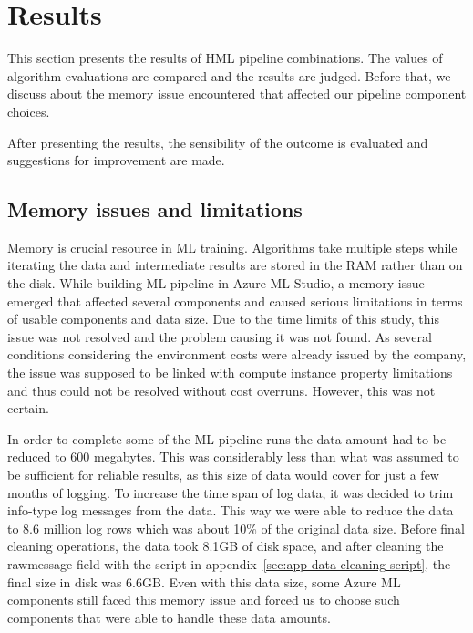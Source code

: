 

\section{Results}\label{sec:results}

This section presents the results of HML pipeline combinations.
The values of algorithm evaluations are compared
and the results are judged.
Before that,
we discuss about the memory issue encountered
that affected our pipeline component choices.

After presenting the results,
the sensibility of the outcome is evaluated
and suggestions for improvement are made.




\subsection{Memory issues and limitations}\label{subsec:res-memory-issues}

Memory is crucial resource in ML training.
Algorithms take multiple steps while iterating the data
and intermediate results are stored in the RAM rather than on the disk.
While building ML pipeline in Azure ML Studio,
a memory issue emerged
that affected several components
and caused serious limitations
in terms of usable components and data size.
Due to the time limits of this study,
this issue was not resolved
and the problem causing it was not found.
As several conditions
considering the environment costs
were already issued by the company,
the issue was supposed to be linked with
compute instance property limitations
and thus could not be resolved without cost overruns.
However, this was not certain.

In order to complete some of the ML pipeline runs
the data amount had to be reduced to 600 megabytes.
This was considerably less than what was assumed to be sufficient
for reliable results,
as this size of data would cover for just a few months of logging.
To increase the time span of log data,
it was decided to trim info-type log messages from the data.
This way we were able to reduce the data to 8.6 million log rows
which was about 10\% of the original data size.
Before final cleaning operations,
the data took 8.1GB of disk space,
and after cleaning the rawmessage-field with the script in appendix~\ref{sec:app-data-cleaning-script},
the final size in disk was 6.6GB\@.
Even with this data size,
some Azure ML components still faced this memory issue
and forced us to choose such components
that were able to handle these data amounts.

